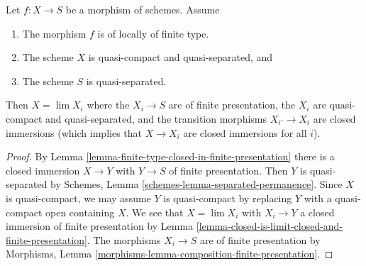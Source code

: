 \begin{lemma}
\label{lemma-finite-type-is-limit-finite-presentation}
Let $f : X \to S$ be a morphism of schemes. Assume
\begin{enumerate}
\item The morphism $f$ is of locally of finite type.
\item The scheme $X$ is quasi-compact and quasi-separated, and
\item The scheme $S$ is quasi-separated.
\end{enumerate}
Then $X = \lim X_i$ where the $X_i \to S$ are of
finite presentation, the $X_i$ are quasi-compact and quasi-separated,
and the transition morphisms $X_{i'} \to X_i$ are closed immersions
(which implies that $X \to X_i$ are closed immersions for all $i$).
\end{lemma}

\begin{proof}
By Lemma \ref{lemma-finite-type-closed-in-finite-presentation}
there is a closed immersion $X \to Y$ with $Y \to S$ of
finite presentation. Then $Y$ is quasi-separated by
Schemes, Lemma \ref{schemes-lemma-separated-permanence}.
Since $X$ is quasi-compact, we may assume
$Y$ is quasi-compact by replacing $Y$ with a quasi-compact open
containing $X$. We see that $X = \lim X_i$ with $X_i \to Y$ a closed
immersion of finite presentation by
Lemma \ref{lemma-closed-is-limit-closed-and-finite-presentation}.
The morphisms $X_i \to S$ are of finite presentation by
Morphisms, Lemma \ref{morphisms-lemma-composition-finite-presentation}.
\end{proof}
